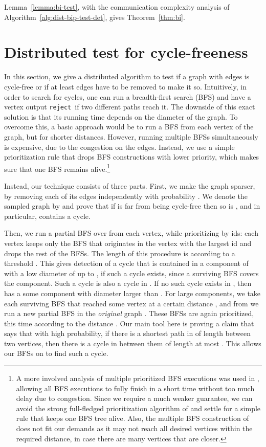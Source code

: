 \documentclass[11pt]{article}
\newcommand{\reject}{\texttt{reject}}
\begin{document}
Lemma~\ref{lemma:bi-test}, with the communication complexity analysis of Algorithm~\ref{alg:dist-bip-test-det}, gives Theorem~\ref{thm:bi}.


\section{Distributed test for cycle-freeness}
\label{sec:cycle}
In this section, we give a distributed algorithm to test if a graph  with  edges is cycle-free
or if at least  edges have to be removed to make it so. Intuitively, in order to search for cycles, one can run a breadth-first search (BFS) and have a vertex output \reject~if two different paths reach it. The downside of this exact solution is that its running time depends on the diameter of the graph. To overcome this, a basic approach would be to run a BFS from each vertex of the graph, but for shorter distances. However, running multiple BFSs simultaneously is expensive, due to the congestion on the edges. Instead, we use a simple prioritization rule that drops BFS constructions with lower priority, which makes sure that one BFS remains alive.\footnote{A more involved analysis of multiple prioritized BFS executions was used in \cite{Holzer2012}, allowing all BFS executions to fully finish in a short time without too much delay due to congestion. Since we require a much weaker guarantee, we can avoid the strong full-fledged prioritization algorithm of \cite{Holzer2012} and settle for a simple rule that keeps one BFS tree alive. Also, the multiple BFS construction of \cite{LenzenP13} does not fit our demands as it may not reach all desired vertices within the required distance, in case there are many vertices that are closer.}

Instead, our technique consists of three parts. First, we make the graph  sparser, by removing each of its edges independently with probability . We denote the sampled graph by  and prove that if  is far from being cycle-free then so is , and in particular,  contains a cycle.

Then, we run a partial BFS over  from each vertex, while prioritizing by ids: each vertex keeps only the BFS that originates in the vertex with the largest id and drops the rest of the BFSs. The length of this procedure is according to a threshold . This gives detection of a cycle that is contained in a component of  with a low diameter of up to , if such a cycle exists, since a surviving BFS covers the component. Such a cycle is also a cycle in . If no such cycle exists in , then  has a some component with diameter larger than . For large components, we take each surviving BFS that reached some vertex  at a certain distance , and from  we run a new partial BFS in the \emph{original} graph . These BFSs are again prioritized, this time according to the distance . Our main tool here is proving a claim that says that with high probability, if there is a shortest path in  of length  between two vertices, then there is a cycle in  between them of length at most . This allows our BFSs on  to find such a cycle.
\end{document}

